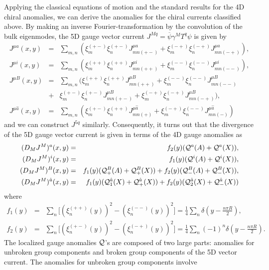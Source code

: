 \documentclass[a4paper,12pt]{article}
\begin{document}
Applying the classical equations of motion and the standard
results for the 4D chiral anomalies\cite{ah,pilo,barbieri}, 
we can derive the anomalies
for the chiral currents classified above. 
By making an inverse Fourier-transformation by the convolution of the bulk 
eigenmodes, the 5D gauge vector current 
$J^{Mq}={\overline\psi}\gamma^MT^q\psi$ is given by 
\begin{eqnarray}
J^{\mu a}(x,y)&=&\sum_{m,n}(\xi^{(+-)}_m\xi^{(+-)}_n J^{\mu a}_{mn(+-)}
+\xi^{(-+)}_m\xi^{(-+)}_n J^{\mu a}_{mn(-+)}),\\
J^{\mu i}(x,y)&=&\sum_{m,n}(\xi^{(++)}_m\xi^{(++)}_n J^{\mu i}_{mn(++)}
+\xi^{(--)}_m\xi^{(--)}_n J^{\mu i}_{mn(--)}), \\
J^{\mu B}(x,y)&=&\sum_{m,n}(\xi^{(++)}_m\xi^{(++)}_n J^{\mu B}_{mn(++)} 
+\xi^{(--)}_m\xi^{(--)}_n J^{\mu B}_{mn(--)} \nonumber \\
&+&\xi^{(+-)}_m\xi^{(+-)}_n J^{\mu B}_{mn(+-)}
+\xi^{(-+)}_m\xi^{(-+)}_n J^{\mu B}_{mn(-+)}),\\
J^{\mu{\hat a}}(x,y)&=&\sum_{m,n}(\xi^{(+-)}_m\xi^{(++)}_n 
J^{\mu{\hat a}}_{mn(+)}+\xi^{(-+)}_m\xi^{(--)}_n J^{\mu{\hat a}}_{mn(-)})
\end{eqnarray}
and we can construct $J^{5 q}$ similarly. 
Consequently, it turns out 
that the divergence of the 5D gauge vector current is given 
in terms of the 4D gauge anomalies as 
\begin{eqnarray}
(D_M J^{M})^a(x,y)&=&f_2(y)({\cal Q}^a(A) +{\cal Q}^a(X)), \\
(D_M J^{M})^i(x,y)&=&f_1(y)({\cal Q}^i(A) +{\cal Q}^i(X)), \\
(D_M J^{M})^B(x,y)&=&f_1(y)({\cal Q}^B_+(A)+{\cal Q}^B_+(X)) 
+f_2(y)({\cal Q}^B_-(A)+{\cal Q}^B_-(X)), \\
(D_M J^{M})^{\hat a}(x,y)&=&f_1(y)({\cal Q}^{\hat a}_1(X)
+{\cal Q}^{\hat a}_+(X))+f_2(y)({\cal Q}^{\hat a}_2(X)
+{\cal Q}^{\hat a}_-(X))
\end{eqnarray}
where
\begin{eqnarray}
f_1(y)&=&\sum_n\bigg[(\xi^{(++)}_n(y))^2 -(\xi^{(--)}_n(y))^2\bigg]
=\frac{1}{4}\sum_n \delta(y-\frac{n\pi R}{2}), \\
f_2(y)&=&\sum_n\bigg[(\xi^{(+-)}_n(y))^2 -(\xi^{(-+)}_n(y))^2\bigg]
=\frac{1}{4}\sum_n (-1)^n\delta(y-\frac{n\pi R}{2}).
\end{eqnarray}
The localized gauge anomalies ${\cal Q}$'s are composed of two large parts: 
anomalies for unbroken group components and broken group components of the 5D
vector current. The anomalies for unbroken group components involve 
\end{document}
